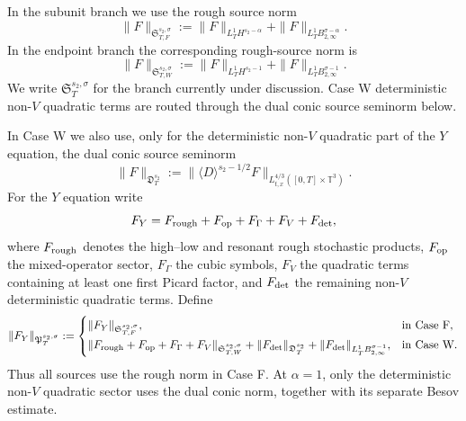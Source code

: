 \documentclass[10pt]{amsart}
\numberwithin{equation}{section}
\theoremstyle{plain}
\theoremstyle{definition}
\theoremstyle{remark}
\newcommand{\Btwo}{B_{2,\infty}}
\begin{document}
In the subunit branch we use the rough source norm
\begin{equation}\label{eq:source-norm-SF}
\|F\|_{\mathfrak S_{T,F}^{s_2,\sigma}}
:=\|F\|_{L_T^1H^{s_2-\alpha}}
 +\|F\|_{L_T^1\Btwo^{\sigma-\alpha}}.
\end{equation}
In the endpoint branch the corresponding rough-source norm is
\begin{equation}\label{eq:source-norm-SW}
\|F\|_{\mathfrak S_{T,W}^{s_2,\sigma}}
:=\|F\|_{L_T^1H^{s_2-1}}
 +\|F\|_{L_T^1\Btwo^{\sigma-1}}.
\end{equation}
We write \(\mathfrak S_T^{s_2,\sigma}\) for the branch currently under discussion.  Case W deterministic non-\(V\) quadratic terms are routed through the dual conic source seminorm below.

In Case W we also use, only for the deterministic non-$V$ quadratic part of the $Y$ equation, the dual conic source seminorm
\begin{equation}\label{eq:endpoint-dual-source-norm}
        \|F\|_{\mathfrak D_T^{s_2}}
        :=\|\langle D\rangle^{s_2-1/2}F\|_{L_{t,x}^{4/3}([0,T]\times\mathbb T^3)}.
\end{equation}
For the $Y$ equation write
\[
        F_Y=F_{\rm rough}+F_{\rm op}+F_\Gamma+F_V+F_{\rm det},
\]
where $F_{\rm rough}$ denotes the high--low and resonant rough stochastic products, $F_{\rm op}$ the mixed-operator sector, $F_\Gamma$ the cubic symbols, $F_V$ the quadratic terms containing at least one first Picard factor, and $F_{\rm det}$ the remaining non-$V$ deterministic quadratic terms.  Define
\begin{equation}\label{eq:source-topologies}
\|F_Y\|_{\mathfrak P_T^{s_2,\sigma}}
:=
\begin{cases}
 \|F_Y\|_{\mathfrak S_{T,F}^{s_2,\sigma}},
 & \text{in Case F},\\[1mm]
 \|F_{\rm rough}+F_{\rm op}+F_\Gamma+F_V\|_{\mathfrak S_{T,W}^{s_2,\sigma}}
 +\|F_{\rm det}\|_{\mathfrak D_T^{s_2}}
 +\|F_{\rm det}\|_{L_T^1B_{2,\infty}^{\sigma-1}},
 & \text{in Case W}.
\end{cases}
\end{equation}
Thus all sources use the rough norm in Case F.  At \(\alpha=1\), only the deterministic non-$V$ quadratic sector uses the dual conic norm, together with its separate Besov estimate.
\end{document}
